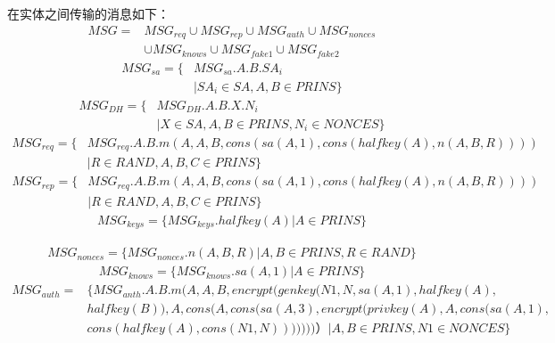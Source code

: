 \documentclass[UTF8]{ctexart}
\begin{document}
{在实体之间传输的消息如下：\\
\begin{equation}
\begin{aligned}
	MSG = & MSG_{req} \cup MSG_{rep} \cup MSG_{auth} \cup MSG_{nonces} \\
	&\cup MSG_{knows} \cup	MSG_{fake1} \cup MSG_{fake2} 
\end{aligned}
\end{equation}
\begin{equation}
	\begin{aligned}
		MSG_{sa}=\{&MSG_{sa}.A.B.SA_{i}\\
		&| SA_{i} \in SA, A,B\in PRINS \} 
	\end{aligned}
	\end{equation}
	\begin{equation}
		\begin{aligned}
			MSG_{DH}=\{&MSG_{DH}.A.B.X.N_{i}\\
			&| X \in SA, A,B\in PRINS , N_{i} \in  NONCES\} 
		\end{aligned}
		\end{equation}		
\begin{equation}
\begin{aligned}
	MSG_{req}=\{&MSG_{req}.A.B.m(A,A,B,cons(sa(A,1),cons(halfkey(A),n(A,B,R))))\\
	&| R \in RAND, A,B,C\in PRINS \} 
\end{aligned}
\end{equation}
\begin{equation}
	\begin{aligned}
		MSG_{rep}=\{&MSG_{req}.A.B.m(A,A,B,cons(sa(A,1),cons(halfkey(A),n(A,B,R))))\\
		&| R \in RAND, A,B,C\in PRINS \} 
	\end{aligned}
	\end{equation}
\begin{equation}
\begin{aligned}
MSG_{keys}=\{MSG_{keys}.halfkey(A)| A \in PRINS\}
\end{aligned}
\end{equation}

\begin{equation}
\begin{aligned}
MSG_{nonces}= \{ MSG_{nonces}.n(A,B,R) | A,B \in PRINS , R \in RAND \}
\end{aligned}
\end{equation}
\begin{equation}
	\begin{aligned}
MSG_{knows}= \{ MSG_{knows}.sa(A,1) | A \in PRINS \}
\end{aligned}
\end{equation}
\begin{equation}
	\begin{aligned}
		MSG_{auth}= &\{ MSG_{anth}.A.B.m(A,A,B,encrypt(genkey(N1,N,sa(A,1),halfkey(A),\\
&halfkey(B)),A,cons(A,cons(sa(A,3),encrypt(privkey(A),A,cons(sa(A,1), \\
&cons(halfkey(A),cons(N1,N)))))))）|A,B \in PRINS, N1 \in NONCES \}
\end{aligned}
\end{equation}

}
\end{document}
